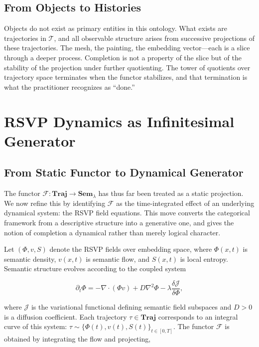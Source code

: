 \documentclass[11pt, twoside]{article}
\theoremstyle{plain}
\theoremstyle{definition}
\theoremstyle{remark}
\begin{document}
\subsection{From Objects to Histories}

Objects do not exist as primary entities in this ontology. What exists are trajectories in $\mathcal{T}$, and all observable structure arises from successive projections of these trajectories. The mesh, the painting, the embedding vector---each is a slice through a deeper process. Completion is not a property of the slice but of the stability of the projection under further quotienting. The tower of quotients over trajectory space terminates when the functor stabilizes, and that termination is what the practitioner recognizes as ``done.''

\section{RSVP Dynamics as Infinitesimal Generator}
\label{sec:rsvp_generator}

\subsection{From Static Functor to Dynamical Generator}

The functor $\mathcal{F} : \mathbf{Traj} \to \mathbf{Sem}_\lambda$ has thus far been treated as a static projection. We now refine this by identifying $\mathcal{F}$ as the time-integrated effect of an underlying dynamical system: the RSVP field equations. This move converts the categorical framework from a descriptive structure into a generative one, and gives the notion of completion a dynamical rather than merely logical character.

Let $(\Phi, v, S)$ denote the RSVP fields over embedding space, where $\Phi(x,t)$ is semantic density, $v(x,t)$ is semantic flow, and $S(x,t)$ is local entropy. Semantic structure evolves according to the coupled system

\[
\partial_t \Phi = -\nabla \cdot (\Phi v) + D \nabla^2 \Phi - \lambda \frac{\delta \mathcal{J}}{\delta \Phi},
\]

where $\mathcal{J}$ is the variational functional defining semantic field subspaces and $D > 0$ is a diffusion coefficient. Each trajectory $\tau \in \mathbf{Traj}$ corresponds to an integral curve of this system: $\tau \sim \{\Phi(t), v(t), S(t)\}_{t \in [0,T]}$. The functor $\mathcal{F}$ is obtained by integrating the flow and projecting,
\end{document}
